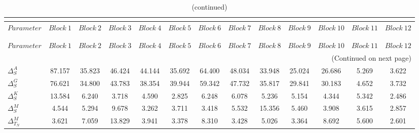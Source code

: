  
\begin{center}
\begin{longtable}{lcccccccccccc} 
\caption{MCMC Inefficiency factors per block}\\
 \label{Table:MCMC_inefficiency_factors}\\
\toprule 
$Parameter             $	 & 	 $     Block~1$	 & 	 $     Block~2$	 & 	 $     Block~3$	 & 	 $     Block~4$	 & 	 $     Block~5$	 & 	 $     Block~6$	 & 	 $     Block~7$	 & 	 $     Block~8$	 & 	 $     Block~9$	 & 	 $    Block~10$	 & 	 $    Block~11$	 & 	 $    Block~12$\\
\midrule \endfirsthead 
\caption{(continued)}\\
 \toprule \\ 
$Parameter             $	 & 	 $     Block~1$	 & 	 $     Block~2$	 & 	 $     Block~3$	 & 	 $     Block~4$	 & 	 $     Block~5$	 & 	 $     Block~6$	 & 	 $     Block~7$	 & 	 $     Block~8$	 & 	 $     Block~9$	 & 	 $    Block~10$	 & 	 $    Block~11$	 & 	 $    Block~12$\\
\midrule \endhead 
\midrule \multicolumn{13}{r}{(Continued on next page)} \\ \bottomrule \endfoot 
\bottomrule \endlastfoot 
$ {\Delta^{A}_{S}}     $	 & 	      87.157	 & 	      35.823	 & 	      46.424	 & 	      44.144	 & 	      35.692	 & 	      64.400	 & 	      48.034	 & 	      33.948	 & 	      25.024	 & 	      26.686	 & 	       5.269	 & 	       3.622 \\ 
$ {\Delta^{G}_{S}}     $	 & 	      76.621	 & 	      34.800	 & 	      43.783	 & 	      38.354	 & 	      39.944	 & 	      59.342	 & 	      47.732	 & 	      35.817	 & 	      29.841	 & 	      30.183	 & 	       4.652	 & 	       3.732 \\ 
$ {\Delta^{K}_{S}}     $	 & 	      13.584	 & 	       6.240	 & 	       3.718	 & 	       4.590	 & 	       2.825	 & 	       6.248	 & 	       6.078	 & 	       5.236	 & 	       5.154	 & 	       4.344	 & 	       5.342	 & 	       2.486 \\ 
$ {\Delta^{M}_{S}}     $	 & 	       4.544	 & 	       5.294	 & 	       9.678	 & 	       3.262	 & 	       3.711	 & 	       3.418	 & 	       5.532	 & 	      15.356	 & 	       5.460	 & 	       3.908	 & 	       3.615	 & 	       2.857 \\ 
$ {\Delta^{M}_{T_N}}   $	 & 	       3.621	 & 	       7.059	 & 	      13.829	 & 	       3.941	 & 	       3.378	 & 	       8.310	 & 	       3.428	 & 	       5.026	 & 	       3.364	 & 	       8.692	 & 	       5.600	 & 	       2.601 \\ 

\end{longtable}
\end{center}
